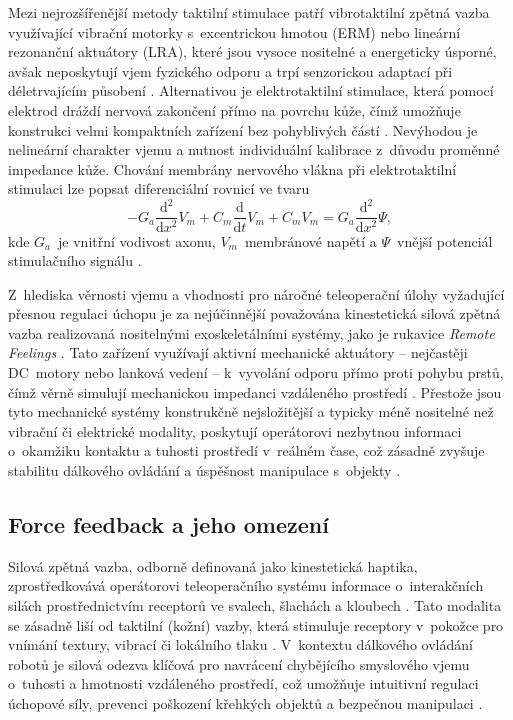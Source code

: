 Mezi nejrozšířenější metody taktilní stimulace patří vibrotaktilní zpětná vazba využívající vibrační motorky s~excentrickou hmotou (ERM) nebo lineární rezonanční aktuátory (LRA), které jsou vysoce nositelné a energeticky úsporné, avšak neposkytují vjem fyzického odporu a trpí senzorickou adaptací při déletrvajícím působení \cite{Kourtesis202271, Park2022, Thomas2023110}.
Alternativou je elektrotaktilní stimulace, která pomocí elektrod dráždí nervová zakončení přímo na povrchu kůže, čímž umožňuje konstrukci velmi kompaktních zařízení bez pohyblivých částí \cite{Kourtesis202271, Yang2025}.
Nevýhodou je nelineární charakter vjemu a nutnost individuální kalibrace z~důvodu proměnné impedance kůže.
Chování membrány nervového vlákna při elektrotaktilní stimulaci lze popsat diferenciální rovnicí ve tvaru
%
\begin{equation}
    -G_a \frac{\mathrm{d}^2}{\mathrm{d}x^2} V_m
    + C_m \frac{\mathrm{d}}{\mathrm{d}t} V_m
    + C_m V_m
    = G_a \frac{\mathrm{d}^2}{\mathrm{d}x^2} \Psi,
\end{equation}
%
kde $G_a$~je vnitřní vodivost axonu, $V_m$~membránové napětí a $\Psi$~vnější potenciál stimulačního signálu \cite{Yang2025}.

Z~hlediska věrnosti vjemu a vhodnosti pro náročné teleoperační úlohy vyžadující přesnou regulaci úchopu je za nejúčinnější považována kinestetická silová zpětná vazba realizovaná nositelnými exoskeletálními systémy, jako je rukavice \textit{Remote Feelings} \cite{Li2025, GIUDICI2025, Giudici2024}.
Tato zařízení využívají aktivní mechanické aktuátory -- nejčastěji DC~motory nebo lanková vedení -- k~vyvolání odporu přímo proti pohybu prstů, čímž věrně simulují mechanickou impedanci vzdáleného prostředí \cite{Li2025, GIUDICI2025}.
Přestože jsou tyto mechanické systémy konstrukčně nejsložitější a typicky méně nositelné než vibrační či elektrické modality, poskytují operátorovi nezbytnou informaci o~okamžiku kontaktu a tuhosti prostředí v~reálném čase, což zásadně zvyšuje stabilitu dálkového ovládání a úspěšnost manipulace s~objekty \cite{Li2025, Park2022, Giudici2024}.
\subsection{Force feedback a jeho omezení}
Silová zpětná vazba, odborně definovaná jako kinestetická haptika, zprostředkovává operátorovi teleoperačního systému informace o~interakčních silách prostřednictvím receptorů ve svalech, šlachách a kloubech \cite{Patel2022, Li2025}.
Tato modalita se zásadně liší od taktilní (kožní) vazby, která stimuluje receptory v~pokožce pro vnímání textury, vibrací či lokálního tlaku \cite{Patel2022, Yang2025}.
V~kontextu dálkového ovládání robotů je silová odezva klíčová pro navrácení chybějícího smyslového vjemu o~tuhosti a hmotnosti vzdáleného prostředí, což umožňuje intuitivní regulaci úchopové síly, prevenci poškození křehkých objektů a bezpečnou manipulaci \cite{GIUDICI2025, Patel2022, Park2022}.


